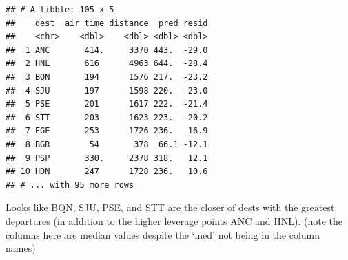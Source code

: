 \documentclass[]{book}
\newenvironment{Shaded}{\begin{snugshade}}{\end{snugshade}}
\newcommand{\DataTypeTok}[1]{\textcolor[rgb]{0.13,0.29,0.53}{#1}}
\newcommand{\KeywordTok}[1]{\textcolor[rgb]{0.13,0.29,0.53}{\textbf{#1}}}
\newcommand{\NormalTok}[1]{#1}
\newcommand{\OperatorTok}[1]{\textcolor[rgb]{0.81,0.36,0.00}{\textbf{#1}}}
\newcommand{\OtherTok}[1]{\textcolor[rgb]{0.56,0.35,0.01}{#1}}
\newcommand{\StringTok}[1]{\textcolor[rgb]{0.31,0.60,0.02}{#1}}
\theoremstyle{definition}
\theoremstyle{definition}
\theoremstyle{definition}
\theoremstyle{remark}
\begin{document}
\begin{Shaded}
\end{Shaded}

\begin{verbatim}
## # A tibble: 105 x 5
##    dest  air_time distance  pred resid
##    <chr>    <dbl>    <dbl> <dbl> <dbl>
##  1 ANC       414.     3370 443.  -29.0
##  2 HNL       616      4963 644.  -28.4
##  3 BQN       194      1576 217.  -23.2
##  4 SJU       197      1598 220.  -23.0
##  5 PSE       201      1617 222.  -21.4
##  6 STT       203      1623 223.  -20.2
##  7 EGE       253      1726 236.   16.9
##  8 BGR        54       378  66.1 -12.1
##  9 PSP       330.     2378 318.   12.1
## 10 HDN       247      1728 236.   10.6
## # ... with 95 more rows
\end{verbatim}

Looks like BQN, SJU, PSE, and STT are the closer of dests with the
greatest departures (in addition to the higher leverage points ANC and
HNL). (note the columns here are median values despite the `med' not
being in the column names)
\end{document}
